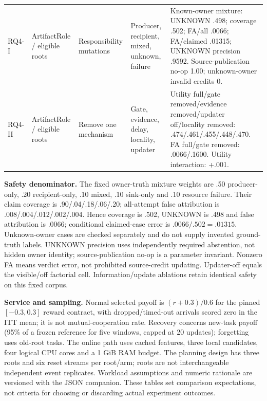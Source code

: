 \documentclass[10pt]{article}
\begin{document}
\begin{table}[H]
\begin{tabularx}{\linewidth}{@{}L{.065\linewidth}L{.13\linewidth}L{.20\linewidth}L{.19\linewidth}Y@{}}
RQ4-I & ArtifactRole / eligible roots & Responsibility mutations & Producer, recipient, mixed, unknown, failure & Known-owner mixture: UNKNOWN .498; coverage .502; FA/all .0066; FA/claimed .01315; UNKNOWN precision .9592. Source-publication no-op 1.00; unknown-owner invalid credits 0.\\
RQ4-II & ArtifactRole / eligible roots & Remove one mechanism & Gate, evidence, delay, locality, updater & Utility full/gate removed/evidence removed/updater off/locality removed: .474/.461/.455/.448/.470. FA full/gate removed: .0066/.1600. Utility interaction: +.001.\\
\bottomrule
\end{tabularx}
\end{table}
\footnotesize
\textbf{Safety denominator.} The fixed owner-truth mixture weights are .50 producer-only,
.20 recipient-only, .10 mixed, .10 sink-only and .10 resource failure. Their claim coverage
is .90/.04/.18/.06/.20; all-attempt false attribution is .008/.004/.012/.002/.004.
Hence coverage is .502, UNKNOWN is .498 and false attribution is .0066; conditional
claimed-case error is $.0066/.502=.01315$. Unknown-owner cases are checked separately
and do not supply invented ground-truth labels. UNKNOWN precision uses independently required abstention, not hidden owner identity;
source-publication no-op is a parameter invariant. Nonzero FA means verdict error,
not prohibited source-credit updating. Updater-off equals the visible/off factorial
cell. Information/update ablations retain identical safety on this fixed corpus.

\textbf{Service and sampling.} Normal selected payoff is $(r+0.3)/0.6$ for the pinned
$[-0.3,0.3]$ reward contract, with dropped/timed-out arrivals scored zero in the ITT mean; it is
not mutual-cooperation rate. Recovery concerns new-task payoff (95\% of a frozen
reference for five windows, capped at 20 updates); forgetting uses old-root tasks. The online path uses cached
features, three local candidates, four logical CPU cores and a 1 GiB RAM budget. The
planning design has three roots and six reset streams per root/arm; roots are not
interchangeable independent event replicates. Workload assumptions and numeric rationale
are versioned with the JSON companion. These tables set comparison expectations, not
criteria for choosing or discarding actual experiment outcomes.
\end{document}
